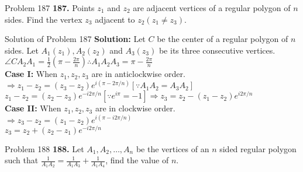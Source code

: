 \documentclass[aspectratio=169,8pt]{beamer}
\begin{document}
\begin{frame}{Problem 187}
  \textbf{187.} Points $z_1$ and $z_2$ are adjacent vertices of a regular polygon of $n$ sides. Find the vertex $z_3$ adjacent to
  $z_2(z_1\neq z_3)$.
\end{frame}
\begin{frame}{Solution of Problem 187}
  \textbf{Solution:} Let $C$ be the center of a regular polygon of $n$ sides. Let $A_1(z_1), A_2(z_2)$ and $A_3(z_3)$ be its three
  consecutive vertices.\\
  \vspace*{0.2cm}
  $\angle CA_2A_1 = \frac{1}{2}\left(\pi - \frac{2\pi}{n}\right) \therefore A_1A_2A_3 = \pi - \frac{2\pi}{n}$\\
  \vspace*{0.2cm}
  \textbf{Case I:} When $z_1, z_2, z_3$ are in anticlockwise order. $\Rightarrow z_1 - z_2 = (z_3 - z_2)e^{i\left(\pi -
    2\pi/n\right)}[\because A_1A_2 = A_3A_2]$\\
  \vspace*{0.2cm}
  $z_1 - z_2 = (z_2 - z_3)e^{-i2\pi/n}[\because e^{i\pi} = -1] \Rightarrow z_3 = z_2 - (z_1 - z_2)e^{i2\pi/n}$\\
  \vspace*{0.2cm}
  \textbf{Case II:} When $z_1, z_2, z_3$ are in clockwise order. $\Rightarrow z_3 - z_2 = (z_1 - z_2)e^{i\left(\pi -
    i2\pi/n\right)}$\\
  \vspace*{0.2cm}
  $z_3 = z_2 + (z_2 - z_1)e^{-i2\pi/n}$
\end{frame}
\begin{frame}{Problem 188}
  \textbf{188.} Let $A_1, A_2, \ldots, A_n$ be the vertices of an $n$ sided regular polygon such that $\frac{1}{A_1A_2} =
  \frac{1}{A_1A_3} + \frac{1}{A_1A_4}$, find the value of $n$.
\end{frame}
\end{document}
